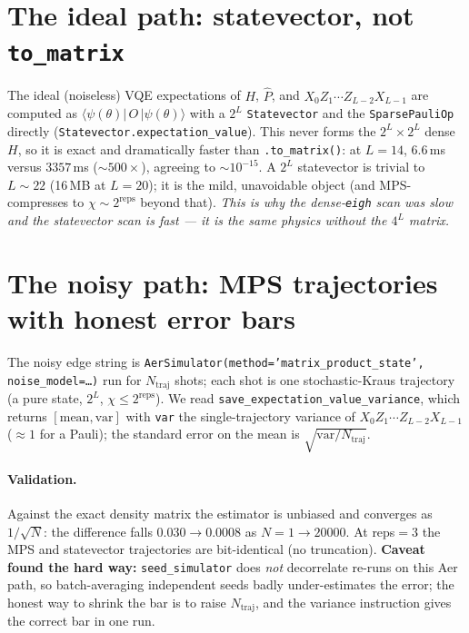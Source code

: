 \documentclass[11pt]{article}
\newcommand{\Pop}{\hat{P}}
\newcommand{\ket}[1]{|#1\rangle}
\newcommand{\bra}[1]{\langle#1|}
\newcommand{\Oedge}{X_0 Z_1\cdots Z_{L-2} X_{L-1}}
\newcommand{\code}[1]{\texttt{#1}}
\begin{document}
\section{The ideal path: statevector, not \code{to\_matrix}}
The ideal (noiseless) VQE expectations of $H$, $\Pop$, and $\Oedge$ are computed
as $\bra{\psi(\theta)}\,O\,\ket{\psi(\theta)}$ with a $2^L$ \code{Statevector} and
the \code{SparsePauliOp} directly (\code{Statevector.expectation\_value}). This
never forms the $2^L\times2^L$ dense $H$, so it is exact and dramatically faster
than \code{.to\_matrix()}: at $L=14$, $6.6$\,ms versus $3357$\,ms
(${\sim}500\times$), agreeing to $\sim10^{-15}$. A $2^L$ statevector is trivial
to $L\sim22$ (16\,MB at $L=20$); it is the mild, unavoidable object (and MPS-
compresses to $\chi\sim2^{\text{reps}}$ beyond that). \emph{This is why the
dense-\code{eigh} scan was slow and the statevector scan is fast --- it is the
same physics without the $4^L$ matrix.}

\section{The noisy path: MPS trajectories with honest error bars}
The noisy edge string is
\code{AerSimulator(method='matrix\_product\_state',\,noise\_model=\ldots)} run for
$N_{\text{traj}}$ shots; each shot is one stochastic-Kraus trajectory (a pure
state, $2^L$, $\chi\le2^{\text{reps}}$). We read
\code{save\_expectation\_value\_variance}, which returns $[\text{mean},
\text{var}]$ with \code{var} the single-trajectory variance of $\Oedge$
($\approx1$ for a Pauli); the standard error on the mean is
$\sqrt{\text{var}/N_{\text{traj}}}$.

\paragraph{Validation.} Against the exact density matrix the estimator is
unbiased and converges as $1/\sqrt{N}$: the difference falls $0.030\to0.0008$ as
$N=1\to20000$. At reps${}=3$ the MPS and statevector trajectories are
bit-identical (no truncation). \textbf{Caveat found the hard way:}
\code{seed\_simulator} does \emph{not} decorrelate re-runs on this Aer path, so
batch-averaging independent seeds badly under-estimates the error; the honest way
to shrink the bar is to raise $N_{\text{traj}}$, and the variance instruction
gives the correct bar in one run.
\end{document}
